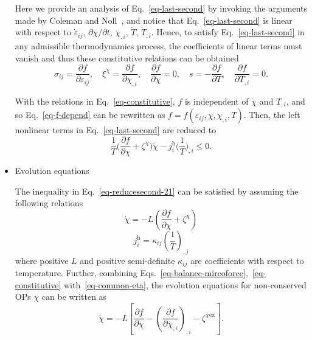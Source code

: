 \documentclass[reprint,3p,sort&compress,times,onecolumn]{elsarticle}
\begin{document}
\begin{itemize}
Here we provide an analysis of Eq.~\ref{eq-last-second} by invoking the arguments made by Coleman and Noll~\cite{coleman1974thermodynamics}, and notice that Eq.~\ref{eq-last-second} is linear with respect to $\dot{\varepsilon}_{ij}$, $\partial\dot{\chi}/\partial t$, $\dot{\chi}_{,i}$, $\dot{T}$, $\dot{T}_{,i}$. %
Hence, to satisfy Eq.~\ref{eq-last-second} in any admissible thermodynamics process, the coefficients of linear terms must vanish and thus these constitutive relations can be obtained
\begin{equation}
\sigma_{ij}=\frac{\partial f}{\partial \varepsilon_{ij}}, \quad \xi^{\chi}=\frac{\partial f}{\partial \chi_{,i}}, \quad \frac{\partial f}{\partial \dot{\chi}}=0, \quad s=-\frac{\partial f}{\partial T}, \quad \frac{\partial f}{\partial T_{,i}}=0. \label{eq-constitutive}
\end{equation}

With the relations in Eq.~\ref{eq-constitutive}, $f$ is independent of $\dot{\chi}$ and $T_{,i}$, and so Eq.~\ref{eq-f-depend} can be rewritten as
$f=f(\varepsilon_{ij}, \chi, \chi_{,i}, T)$.
Then, the left nonlinear terms in Eq.~\ref{eq-last-second} are reduced to
\begin{equation}
\frac{1}{T} \Big(\frac{\partial f}{\partial \chi}+\zeta^{\chi} \Big)\dot{\chi}-j_i^{\text{h}}\Big(\frac{1}{T}\Big)_{,i} \leq 0 . \label{eq-reducesecond-21}
\end{equation}

\item Evolution equations

The inequality in Eq.~\ref{eq-reducesecond-21} can be satisfied by assuming the following relations
\begin{equation}
\dot{\chi} = -L \left( \frac{\partial f}{\partial \chi}+\zeta^{\chi} \right) \label{eq-common-eta}
\end{equation}
\begin{equation}
j_i^{\text{h}}=\kappa_{ij}\left(\frac{1}{T}\right)_{,j}
\end{equation}
where positive $L$ and positive semi-definite $\kappa_{ij}$ are coefficients with respect to temperature. 
Further, combining Eqs.~\ref{eq-balance-mircoforce},~\ref{eq-constitutive} with~\ref{eq-common-eta}, the evolution equations for non-conserved OPs $\chi$ can be written as
\begin{equation}
\dot{\chi}= -L \left[\frac{\partial f}{\partial \chi}- \left(\frac{\partial f}{\partial \chi_{,i}} \right)_{,i} - \zeta^{\chi\text{ex}} \right]. \label{eq-AC}
\end{equation}


\end{itemize}
\end{document}
